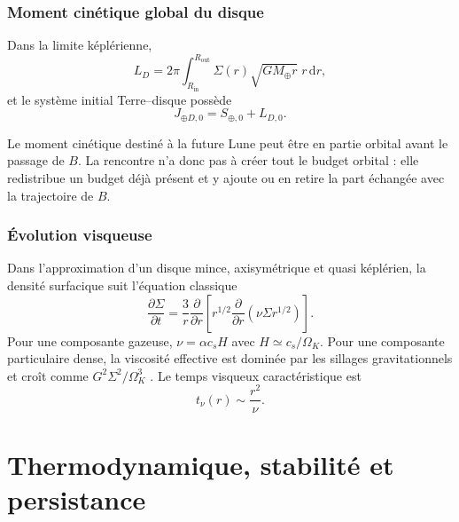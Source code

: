 \documentclass[11pt,a4paper,openany]{report}
\newcommand{\Mt}{M_{\oplus}}
\newcommand{\dd}{\mathrm{d}}
\begin{document}
\subsection{Moment cinétique global du disque}

Dans la limite képlérienne,
\begin{equation}
L_D=2\pi\int_{R_{\mathrm{in}}}^{R_{\mathrm{out}}}\Sigma(r)\sqrt{G\Mt r}\;r\,\dd r,
\label{eq:LD}
\end{equation}
et le système initial Terre--disque possède
\begin{equation}
J_{\oplus D,0}=S_{\oplus,0}+L_{D,0}.
\label{eq:J0}
\end{equation}

\begin{ideephys}
Le moment cinétique destiné à la future Lune peut être en partie orbital avant le passage de
$B$. La rencontre n'a donc pas à créer tout le budget orbital : elle redistribue un budget déjà
présent et y ajoute ou en retire la part échangée avec la trajectoire de $B$.
\end{ideephys}

\subsection{Évolution visqueuse}

Dans l'approximation d'un disque mince, axisymétrique et quasi képlérien, la densité surfacique
suit l'équation classique \cite{Pringle1981}
\begin{equation}
\frac{\partial\Sigma}{\partial t}=\frac{3}{r}\frac{\partial}{\partial r}
\left[r^{1/2}\frac{\partial}{\partial r}\left(\nu\Sigma r^{1/2}\right)\right].
\label{eq:visc}
\end{equation}
Pour une composante gazeuse, $\nu=\alpha c_sH$ avec $H\simeq c_s/\Omega_K$. Pour une
composante particulaire dense, la viscosité effective est dominée par les sillages
gravitationnels et croît comme $G^2\Sigma^2/\Omega_K^3$ \cite{Daisaka2001}. Le temps
visqueux caractéristique est
\begin{equation}
t_\nu(r)\sim\frac{r^2}{\nu}.
\label{eq:tnu}
\end{equation}


\chapter{Thermodynamique, stabilité et persistance}
\label{ch:thermo}
\end{document}
